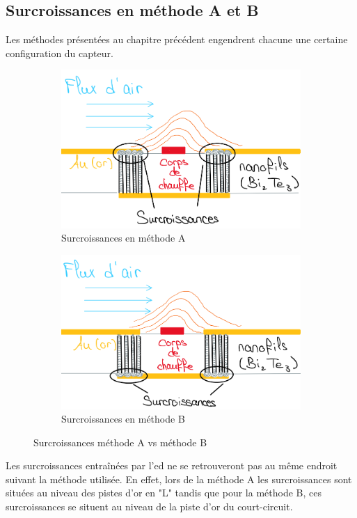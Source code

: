 \subsection{Surcroissances en méthode A et B}
Les méthodes présentées au chapitre précédent engendrent chacune une certaine configuration du capteur. 
\begin{figure}[H]
    \hspace{-0.1cm}
    \begin{subfigure}{0.45\textwidth}
        \includegraphics[scale = 0.4]{assets/figures/Methode_A_surcroissances.png}
        \caption{Surcroissances en méthode A}
    \end{subfigure}
    \hspace{0.7cm}
    \begin{subfigure}{0.45\textwidth}
        \includegraphics[scale = 0.4]{assets/figures/Methode_B_surcroissances.png}
        \caption{Surcroissances en méthode B}
    \end{subfigure}
    \caption{Surcroissances méthode A vs méthode B}
\end{figure}
Les surcroissances entraînées par l'\gls{ed} ne se retrouveront pas au même endroit suivant la méthode utilisée. En effet, lors de la méthode A 
les surcroissances sont situées au niveau des pistes d'or en "L" tandis que pour la méthode B, ces surcroissances se situent au niveau de la piste 
d'or du court-circuit. 

